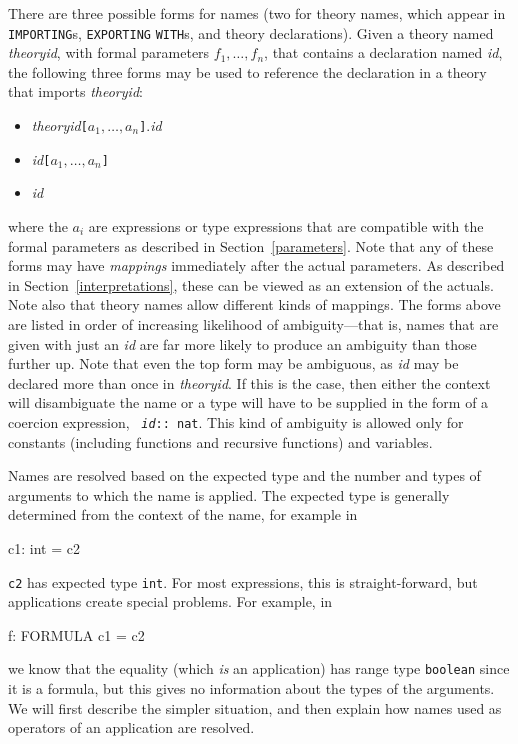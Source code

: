 There are three possible forms for names (two for theory names, which
appear in \texttt{IMPORTING}s, \texttt{EXPORTING} \texttt{WITH}s, and
theory declarations).  Given a theory named \emph{theoryid}, with formal
parameters $f_1,\ldots,f_n$, that contains a declaration named \emph{id},
the following three forms may be used to reference the declaration in a
theory that imports \emph{theoryid}:
\begin{itemize}
\item \emph{theoryid}\texttt{[$a_1,\ldots,a_n$]}.\emph{id}

\item \emph{id}\texttt{[$a_1,\ldots,a_n$]}

\item \emph{id}
\end{itemize}
where the $a_i$ are expressions or type expressions that are compatible
with the formal parameters as described in Section~\ref{parameters}.  Note
that any of these forms may have \emph{mappings} immediately after the
actual parameters.  As described in Section~\ref{interpretations}, these can be
viewed as an extension of the actuals.  Note also that theory names allow
different kinds of mappings.  The forms above are listed in order of
increasing likelihood of ambiguity---that is, names that are given with
just an \emph{id} are far more likely to produce an ambiguity than those
further up.  Note that even the top form may be ambiguous, as \emph{id}
may be declared more than once in \emph{theoryid}.  If this is the case,
then either the context will disambiguate the name or a type will have to
be supplied in the form of a coercion expression, \eg\
\texttt{\emph{id}::~nat}.  This kind of ambiguity is allowed only for
constants (including functions and recursive functions) and variables.

Names are resolved based on the expected type and the number and types of
arguments to which the name is applied.  The expected type is generally
determined from the context of the name, for example in
\begin{pvsex}
  c1: int = c2
\end{pvsex}
\texttt{c2} has expected type \texttt{int}.  For most expressions, this is
straight-forward, but applications create special problems.  For example,
in
\begin{pvsex}
  f: FORMULA c1 = c2
\end{pvsex}
we know that the equality (which \emph{is} an application) has range type
\texttt{boolean} since it is a formula, but this gives no information
about the types of the arguments.  We will first describe the simpler
situation, and then explain how names used as operators of an application
are resolved.

